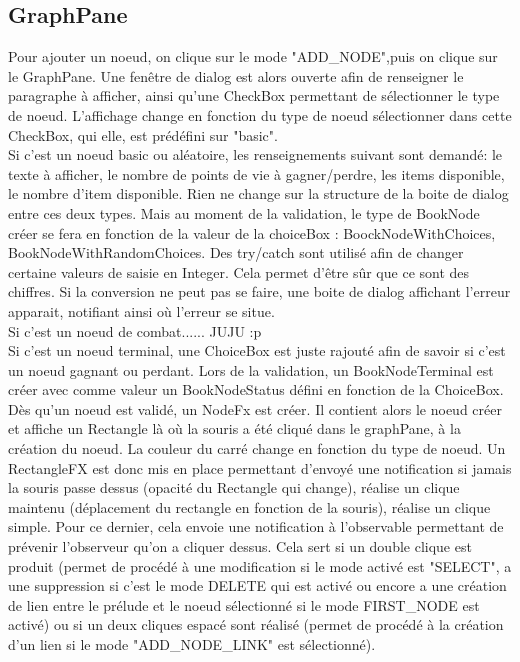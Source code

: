 		\subsection{GraphPane}
		Pour ajouter un noeud, on clique sur le mode "ADD_NODE",puis on clique sur le GraphPane. Une fenêtre de dialog est alors ouverte afin de renseigner le paragraphe à afficher, ainsi qu'une CheckBox permettant de sélectionner le type de noeud. L'affichage change en fonction du type de noeud sélectionner dans cette CheckBox, qui elle, est prédéfini sur "basic".\\

		Si c'est un noeud basic ou aléatoire, les renseignements suivant sont demandé: le texte à afficher, le nombre de points de vie à gagner/perdre, les items disponible, le nombre d'item disponible. Rien ne change sur la structure de la boite de dialog entre ces deux types. Mais au moment de la validation, le type de BookNode créer se fera en fonction de la valeur de la choiceBox : BoockNodeWithChoices, BookNodeWithRandomChoices. Des try/catch sont utilisé afin de changer certaine valeurs de saisie en Integer. Cela permet d'être sûr que ce sont des chiffres. Si la conversion ne peut pas se faire, une boite de dialog affichant l'erreur apparait, notifiant ainsi où l'erreur se situe.\\

		Si c'est un noeud de combat...... JUJU  :p\\


		Si c'est un noeud terminal, une ChoiceBox est juste rajouté afin de savoir si c'est un noeud gagnant ou perdant. Lors de la validation, un BookNodeTerminal est créer avec comme valeur un BookNodeStatus défini en fonction de la ChoiceBox.\\

		Dès qu'un noeud est validé, un NodeFx est créer. Il contient alors le noeud créer et affiche un Rectangle là où la souris a été cliqué dans le graphPane, à la création du noeud. La couleur du carré change en fonction du type de noeud. Un RectangleFX est donc mis en place permettant d'envoyé une notification si jamais la souris passe dessus (opacité du Rectangle qui change), réalise un clique maintenu (déplacement du rectangle en fonction de la souris), réalise un clique simple. Pour ce dernier, cela envoie une notification à l'observable permettant de prévenir l'observeur qu'on a cliquer dessus. Cela sert si un double clique est produit (permet de procédé à une modification si le mode activé est "SELECT", a une suppression si c'est le mode DELETE qui est activé ou encore a une création de lien entre le prélude et le noeud sélectionné si le mode FIRST_NODE est activé) ou si un deux cliques espacé sont réalisé (permet de procédé à la création d'un lien si le mode "ADD_NODE_LINK" est sélectionné).\\

